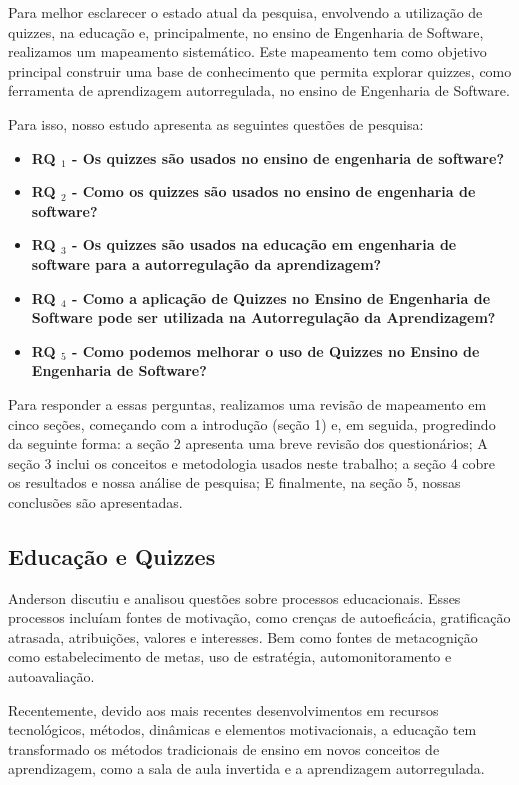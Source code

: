 Para melhor esclarecer o estado atual da pesquisa, envolvendo a utilização de quizzes, na educação e, principalmente, no ensino de Engenharia de Software, realizamos um mapeamento sistemático. Este mapeamento tem como objetivo principal construir uma base de conhecimento que permita explorar quizzes, como ferramenta de aprendizagem autorregulada, no ensino de Engenharia de Software.

Para isso, nosso estudo apresenta as seguintes questões de pesquisa:

\begin {itemize}
    \item\textbf {RQ $ _1 $ - Os quizzes são usados no ensino de engenharia de software?}
     \item\textbf {RQ $ _2 $ - Como os quizzes são usados no ensino de engenharia de software?}
     \item\textbf {RQ $ _3 $ - Os quizzes são usados na educação em engenharia de software para a autorregulação da aprendizagem?}
     \item\textbf {RQ $ _4 $ - Como a aplicação de Quizzes no Ensino de Engenharia de Software pode ser utilizada na Autorregulação da Aprendizagem?}
     \item\textbf {RQ $ _5 $ - Como podemos melhorar o uso de Quizzes no Ensino de Engenharia de Software?}
\end {itemize}

Para responder a essas perguntas, realizamos uma revisão de mapeamento em cinco seções, começando com a introdução (seção 1) e, em seguida, progredindo da seguinte forma: a seção 2 apresenta uma breve revisão dos questionários; A seção 3 inclui os conceitos e metodologia usados neste trabalho; a seção 4 cobre os resultados e nossa análise de pesquisa; E finalmente, na seção 5, nossas conclusões são apresentadas.

\subsection{Educação e Quizzes}

Anderson \cite{anderson_reflections_1984} discutiu e analisou questões sobre processos educacionais. Esses processos incluíam fontes de motivação, como crenças de autoeficácia, gratificação atrasada, atribuições, valores e interesses. Bem como fontes de metacognição como estabelecimento de metas, uso de estratégia, automonitoramento e autoavaliação.

Recentemente, devido aos mais recentes desenvolvimentos em recursos tecnológicos, métodos, dinâmicas e elementos motivacionais, a educação tem transformado os métodos tradicionais de ensino em novos conceitos de aprendizagem, como a sala de aula invertida e a aprendizagem autorregulada.

